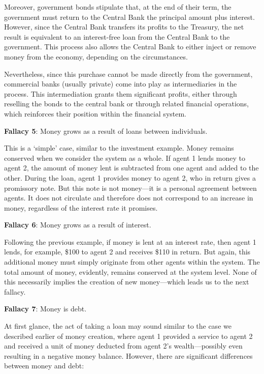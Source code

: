 Moreover, government bonds stipulate that, at the end of their term, the government must return to the Central Bank the principal amount plus interest. However, since the Central Bank transfers its profits to the Treasury, the net result is equivalent to an interest-free loan from the Central Bank to the government. This process also allows the Central Bank to either inject or remove money from the economy, depending on the circumstances.

Nevertheless, since this purchase cannot be made directly from the government, commercial banks (usually private) come into play as intermediaries in the process. This intermediation grants them significant profits, either through reselling the bonds to the central bank or through related financial operations, which reinforces their position within the financial system.

\textbf{Fallacy 5}: Money grows as a result of loans between individuals.

This is a ‘simple’ case, similar to the investment example. Money remains conserved when we consider the system as a whole. If agent 1 lends money to agent 2, the amount of money lent is subtracted from one agent and added to the other. During the loan, agent 1 provides money to agent 2, who in return gives a promissory note. But this note is not money—it is a personal agreement between agents. It does not circulate and therefore does not correspond to an increase in money, regardless of the interest rate it promises.

\textbf{Fallacy 6}: Money grows as a result of interest.

Following the previous example, if money is lent at an interest rate, then agent 1 lends, for example, \$100 to agent 2 and receives \$110 in return. But again, this additional money must simply originate from other agents within the system. The total amount of money, evidently, remains conserved at the system level. None of this necessarily implies the creation of new money—which leads us to the next fallacy.

\textbf{Fallacy 7}: Money is debt.

At first glance, the act of taking a loan may sound similar to the case we described earlier of money creation, where agent 1 provided a service to agent 2 and received a unit of money deducted from agent 2’s wealth—possibly even resulting in a negative money balance. However, there are significant differences between money and debt:

